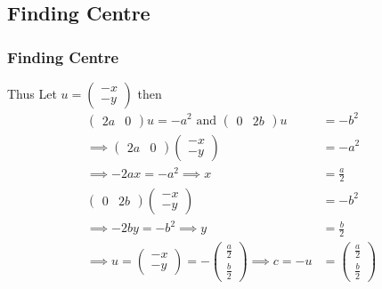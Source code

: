 \documentclass{beamer}
\theoremstyle{remark}
\newcommand{\myvec}[1]{\ensuremath{\begin{pmatrix}#1\end{pmatrix}}}
\numberwithin{equation}{section}
\begin{document}
\subsection{Finding Centre}
\begin{frame}[fragile]
\frametitle{Finding Centre}
Thus 
Let $u=\myvec{-x\\-y}$ then
\begin{align}
    \myvec{2a&0}u=-a^2\text{ and }\myvec{0&2b}u&=-b^2\\ 
    \implies\myvec{2a&0}\myvec{-x\\-y}&=-a^2\\
    \implies-2ax=-a^2\implies x&=\frac{a}{2}\\
    \myvec{0&2b}\myvec{-x\\-y}&=-b^2\\
    \implies-2by=-b^2\implies y&=\frac{b}{2}\\
    \implies u=\myvec{-x\\-y}=-\myvec{\frac{a}{2}\\ \frac{b}{2}}
    \implies c=-u&=\myvec{\frac{a}{2}\\ \frac{b}{2}}
\end{align}
\end{frame}
\end{document}
